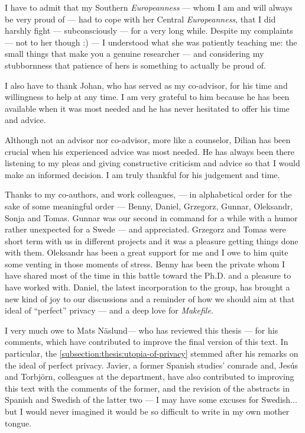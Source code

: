 I have to admit that my Southern \emph{Europeanness} --- whom I am and will always 
be very proud of --- had to cope with her Central \emph{Europeanness}, that I did 
harshly fight --- subconsciously --- for a very long while. Despite my complaints 
--- not to her though :) --- I understood what she was patiently teaching me: the 
small things that make you a genuine researcher --- and considering my stubbornness 
that patience of hers is something to actually be proud of.

I also have to thank Johan, who has served as my co-advisor, for his time and willingness 
to help at any time. I am very grateful to him because he has been available when 
it was most needed and he has never hesitated to offer his time and advice. 

Although not an advisor nor co-advisor, more like a counselor, Dilian has been crucial 
when his experienced advice was most needed. He has always been there listening 
to my pleas and giving constructive criticism and advice so that I would make an 
informed decision. I am truly thankful for his judgement and time.

Thanks to my co-authors, and work colleagues, --- in alphabetical order for the 
sake of some meaningful order --- Benny, Daniel, Grzegorz, Gunnar, Oleksandr, Sonja 
and Tomas. Gunnar was our second in command for a while with a humor rather unexpected 
for a Swede --- and appreciated. Grzegorz and Tomas were short term with us in different 
projects and it was a pleasure getting things done with them. Oleksandr has been 
a great support for me and I owe to him quite some venting in those moments of stress. 
Benny has been the private whom I have shared most of the time in this battle toward 
the Ph.D. and a pleasure to have worked with. Daniel, the latest incorporation 
to the group, has brought a new kind of joy to our discussions and a reminder of 
how we should aim at that ideal of ``perfect'' privacy --- and a deep love for 
\emph{Makefile}.

I very much owe to Mats N\"{a}slund--- who has reviewed this thesis --- for his 
comments, which have contributed to improve the final version of this text. In particular, 
the \cref{subsection:thesis:utopia-of-privacy} stemmed after his remarks on the 
ideal of perfect privacy. Javier, a former Spanish studies' comrade and, Jes\'{u}s 
and Torbj\"{o}rn, colleagues at the department, have also contributed to improving 
this text with the comments of the former, and the revision of the abstracts in 
Spanish and Swedish of the latter two --- I may have some excuses for Swedish... 
but I would never imagined it would be so difficult to write in my own mother tongue. 

